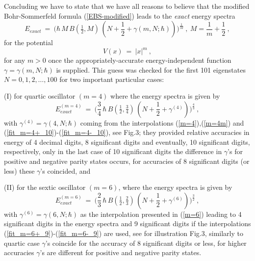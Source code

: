 \documentclass[preprint,preprintnumbers,amsmath,amssymb]{revtex4}
\begin{document}
Concluding we have to state that we have all reasons to believe that the modified Bohr-Sommerfeld formula (\ref{EBS-modified}) leads to the {\it exact} energy spectra
\[
		E_{exact}\ =\ \bigg({\hbar}\,M\,B\left(\tfrac{1}{2},M\right)\,
		\left(N+\frac{1}{2}+\gamma(m,N;\hbar)\right)\bigg)^{\frac{1}{M}}\ ,
		\ M=\frac{1}{m}+\frac{1}{2}\ ,
\]
for the potential
\[
       V(x)\ =\ |x|^m \ ,
\]
for any $m>0$ once the appropriately-accurate energy-independent function $\gamma=\gamma(m,N;\hbar)$ is supplied. This guess was checked for the first 101 eigenstates $N=0,1,2,\ldots, 100$ for two important particular cases:
 
\noindent
(I) for quartic oscillator $(m=4)$ where the energy spectra is given by
\begin{equation}
\label{m=4exact}
		E^{(m=4)}_{exact}\ =\
           \bigg(\frac{3}{4}\,{\hbar}\,B\left(\tfrac{1}{2},\tfrac{3}{4}\right)\,
		\left( N+\frac{1}{2}+\gamma^{(4)} \right)\bigg)^{\frac{4}{3}}\ ,
\end{equation}
with $\gamma^{(4)}=\gamma(4,N;\hbar)$ coming from the interpolations (\ref{m=4}),(\ref{m=4m}) and (\ref{fit_m=4+_10})-(\ref{fit_m=4-_10}), see Fig.3; they provided relative accuracies in energy of 4 decimal digits, 8 significant digits and eventually, 10 significant digits, respectively, only in the last case of 10 significant digits the difference in $\gamma$'s for positive and negative parity states occurs, for accuracies of 8 significant digits (or less) these $\gamma$'s coincided, and

\noindent
(II) for the sextic oscillator $(m=6)$, where the energy spectra is given by
\begin{equation}
\label{m=6exact}
		E^{(m=6)}_{exact}\ =\
           \bigg(\frac{2}{3}\,{\hbar}\,B\left(\tfrac{1}{2},\tfrac{2}{3}\right)\,
		\left( N+\frac{1}{2}+\gamma^{(6)} \right)\bigg)^{\frac{3}{2}}\ ,
\end{equation}
with $\gamma^{(6)}=\gamma(6,N;\hbar)$ as the interpolation presented in (\ref{m=6}) leading to 4 significant digits in the energy spectra and 9 significant digits if the interpolations (\ref{fit_m=6+_9})-(\ref{fit_m=6-_9}) are used, see for illustration Fig.3, similarly to quartic case $\gamma$'s coincide for the accuracy of 8 significant digits or less, for higher accuracies $\gamma$'s are different for positive and negative parity states.
  
\end{document}
